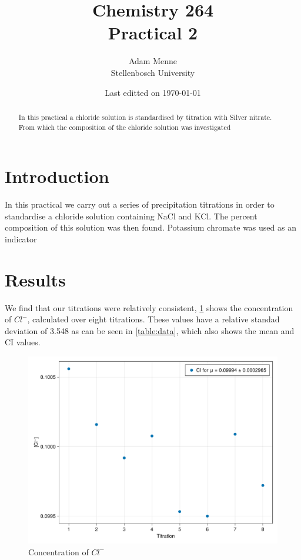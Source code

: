 \documentclass[a4paper, british]{article}
\title{Chemistry 264\\ Practical 2}
\date{Last editted on \today}
\author{Adam Menne\\ Stellenbosch University}
\begin{document}
\maketitle

\begin{abstract}
\noindent
In this practical a chloride solution is standardised by titration with Silver nitrate. From which the composition of the chloride solution was investigated
\end{abstract}

\tableofcontents

\newpage

\section{Introduction}

In this practical we carry out a series of precipitation titrations in order to standardise a chloride solution containing NaCl and KCl. The percent composition of this solution was then found. Potassium chromate was used as an indicator


\section{Results}

We find that our titrations were relatively consistent, \cref{fig:mean} shows the concentration of \(Cl^-\), calculated over eight titrations. These values have a relative standad deviation of 3.548 as can be seen in \cref{table:data}, which also shows the mean and CI values.

\begin{figure}[h]
    \centering
    \includegraphics[width=\textwidth]{figures/conc.pdf}
    \caption{Concentration of \(Cl^-\)}
    \label{fig:mean}
\end{figure}
\end{document}
